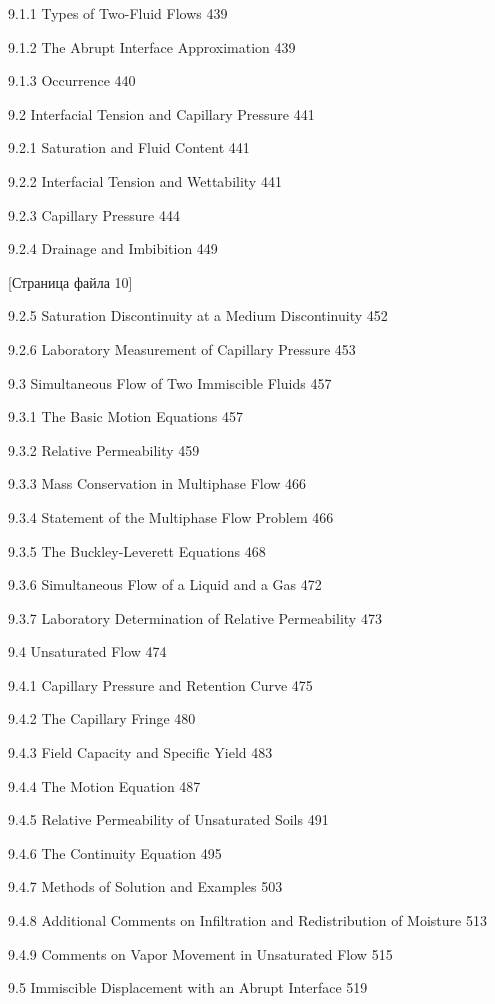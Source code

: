 \documentclass[
  11pt,
]{article}
\begin{document}
9.1.1 Types of Two-Fluid Flows 439 \par
9.1.2 The Abrupt Interface Approximation 439 \par
9.1.3 Occurrence 440 \par
9.2 Interfacial Tension and Capillary Pressure 441 \par
9.2.1 Saturation and Fluid Content 441 \par
9.2.2 Interfacial Tension and Wettability 441 \par
9.2.3 Capillary Pressure 444 \par
9.2.4 Drainage and Imbibition 449 \par
\smallskip
\smallskip
\smallskip
{[}Страница файла 10{]}\par
9.2.5 Saturation Discontinuity at a Medium Discontinuity 452 \par
9.2.6 Laboratory Measurement of Capillary Pressure 453 \par
9.3 Simultaneous Flow of Two Immiscible Fluids 457 \par
9.3.1 The Basic Motion Equations 457 \par
9.3.2 Relative Permeability 459 \par
9.3.3 Mass Conservation in Multiphase Flow 466 \par
9.3.4 Statement of the Multiphase Flow Problem 466 \par
9.3.5 The Buckley-Leverett Equations 468 \par
9.3.6 Simultaneous Flow of a Liquid and a Gas 472 \par
9.3.7 Laboratory Determination of Relative Permeability 473 \par
9.4 Unsaturated Flow 474 \par
9.4.1 Capillary Pressure and Retention Curve 475 \par
9.4.2 The Capillary Fringe 480 \par
9.4.3 Field Capacity and Specific Yield 483 \par
9.4.4 The Motion Equation 487 \par
9.4.5 Relative Permeability of Unsaturated Soils 491 \par
9.4.6 The Continuity Equation 495 \par
9.4.7 Methods of Solution and Examples 503 \par
9.4.8 Additional Comments on Infiltration and Redistribution of Moisture 513 \par
9.4.9 Comments on Vapor Movement in Unsaturated Flow 515 \par
9.5 Immiscible Displacement with an Abrupt Interface 519 \par
\end{document}

